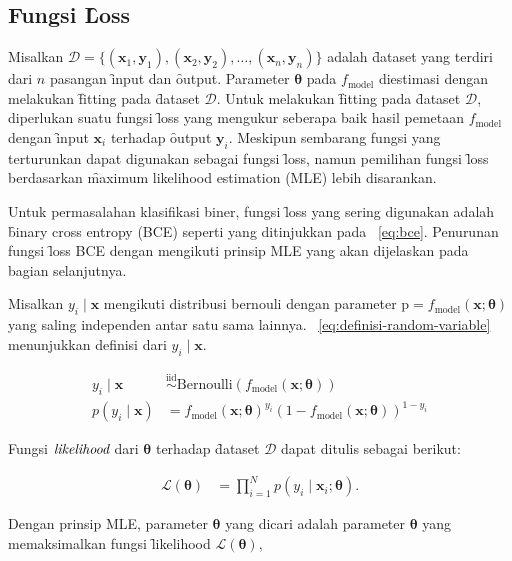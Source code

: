     \subsection{Fungsi \f{Loss}}
    Misalkan $\mathcal{D} = \{(\mathbf{x}_1, \mathbf{y}_1), (\mathbf{x}_2, \mathbf{y}_2), \dots, (\mathbf{x}_n, \mathbf{y}_n)\}$ adalah \f{dataset} yang terdiri dari $n$ pasangan \f{input} dan \f{output}. Parameter $\bm{\theta}$ pada $f_{\text{model}}$ diestimasi dengan melakukan \f{fitting} pada \f{dataset} $\mathcal{D}$. Untuk melakukan \f{fitting} pada \f{dataset} $\mathcal{D}$, diperlukan suatu fungsi \f{loss} yang mengukur seberapa baik hasil pemetaan $f_{\text{model}}$ dengan \f{input} $\mathbf{x}_i$ terhadap \f{output} $\mathbf{y}_i$. Meskipun sembarang fungsi yang terturunkan dapat digunakan sebagai fungsi \f{loss}, namun pemilihan fungsi \f{loss} berdasarkan \f{maximum likelihood estimation} (MLE) lebih disarankan. 
    
    Untuk permasalahan klasifikasi biner, fungsi \f{loss} yang sering digunakan adalah \f{binary cross entropy} (BCE) seperti yang ditinjukkan pada \equ~\ref{eq:bce}. Penurunan fungsi \f{loss} BCE dengan mengikuti prinsip MLE yang akan dijelaskan pada bagian selanjutnya.
    
    Misalkan $y_i \mid \mathbf{x}$ mengikuti distribusi bernouli dengan parameter $\text{p} = f_{\text{model}}(\mathbf{x};\bm{\theta})$ yang saling independen antar satu sama lainnya. \equ~\ref{eq:definisi-random-variable} menunjukkan definisi dari $y_i \mid \mathbf{x}$.

    \begin{align}
        \label{eq:definisi-random-variable}
        y_i \mid \mathbf{x} &\overset{\text{iid}}{\sim} \text{Bernoulli}(f_{\text{model}}(\mathbf{x};\bm{\theta})) \\
        p(y_i \mid \mathbf{x}) &= f_{\text{model}}(\mathbf{x};\bm{\theta})^{y_i} (1 - f_{\text{model}}(\mathbf{x};\bm{\theta}))^{1 - y_i} 
    \end{align} 

    Fungsi $\textit{likelihood}$ dari $\bm{\theta}$ terhadap \f{dataset} $\mathcal{D}$ dapat ditulis sebagai berikut:

    \begin{align}
        \mathcal{L}(\bm{\theta}) &= \prod_{i=1}^N p(y_i \mid \mathbf{x}_i; \bm{\theta}).
    \end{align}

    Dengan prinsip MLE, parameter $\bm{\theta}$ yang dicari adalah parameter $\bm{\theta}$ yang memaksimalkan fungsi \f{likelihood} $\mathcal{L}(\bm{\theta})$,

